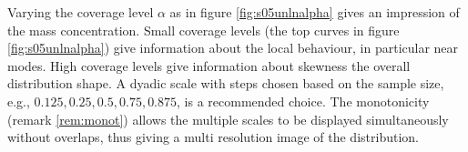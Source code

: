 \documentclass[dvips,12pt,a4paper,twoside]{amsart}
\begin{document}
Varying the coverage level $\alpha$ as in figure \ref{fig:s05unlnalpha} gives an impression of the mass concentration. Small coverage levels (the top curves in figure  \ref{fig:s05unlnalpha}) give information about the local behaviour, in particular near modes. High coverage levels give information about skewness the overall distribution shape. A dyadic scale with steps chosen based on the sample size, e.g., $0.125, 0.25, 0.5, 0.75, 0.875$,  is a recommended choice. The monotonicity (remark \ref {rem:monot}) allows the multiple  scales to be displayed simultaneously without overlaps, thus giving a multi resolution image of the distribution.

%
%
\end{document}
